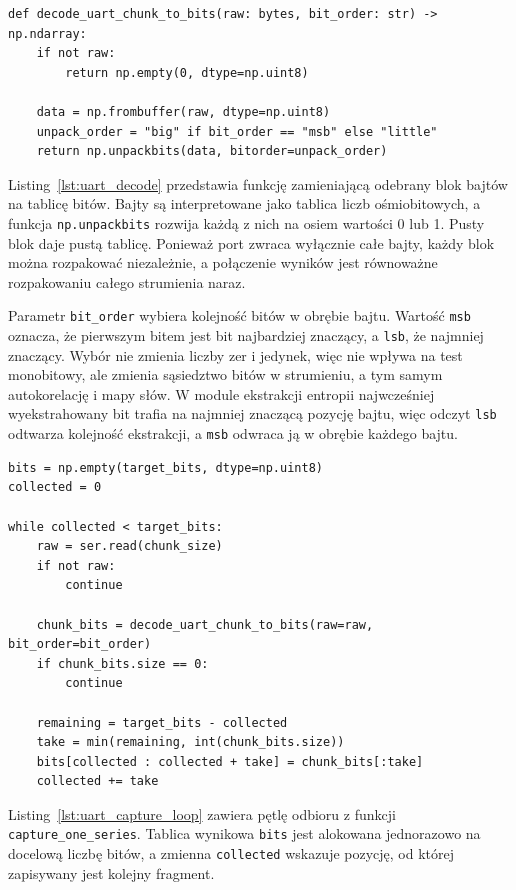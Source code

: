 \begin{lstlisting}[style=pycode,
    caption={Rozpakowanie bajtów do bitów (\texttt{uart\_capture.py})},
    label={lst:uart_decode}]
def decode_uart_chunk_to_bits(raw: bytes, bit_order: str) -> np.ndarray:
    if not raw:
        return np.empty(0, dtype=np.uint8)

    data = np.frombuffer(raw, dtype=np.uint8)
    unpack_order = "big" if bit_order == "msb" else "little"
    return np.unpackbits(data, bitorder=unpack_order)
\end{lstlisting}

Listing~\ref{lst:uart_decode} przedstawia funkcję zamieniającą odebrany blok
bajtów na tablicę bitów. Bajty są interpretowane jako tablica liczb
ośmiobitowych, a funkcja \texttt{np.unpackbits} rozwija każdą z nich na osiem
wartości 0 lub 1. Pusty blok daje pustą tablicę. Ponieważ port zwraca wyłącznie
całe bajty, każdy blok można rozpakować niezależnie, a połączenie wyników jest
równoważne rozpakowaniu całego strumienia naraz.

Parametr \texttt{bit\_order} wybiera kolejność bitów w obrębie bajtu.
Wartość \texttt{msb} oznacza, że pierwszym bitem jest bit najbardziej
znaczący, a \texttt{lsb}, że najmniej znaczący. Wybór nie zmienia liczby zer
i jedynek, więc nie wpływa na test monobitowy, ale zmienia sąsiedztwo bitów
w strumieniu, a tym samym autokorelację i mapy słów. W module ekstrakcji
entropii najwcześniej wyekstrahowany bit trafia na najmniej znaczącą pozycję
bajtu, więc odczyt \texttt{lsb} odtwarza kolejność ekstrakcji, a \texttt{msb}
odwraca ją w obrębie każdego bajtu.

\begin{lstlisting}[style=pycode,
    caption={Odbiór serii o zadanej długości (\texttt{uart\_capture.py})},
    label={lst:uart_capture_loop}]
bits = np.empty(target_bits, dtype=np.uint8)
collected = 0

while collected < target_bits:
    raw = ser.read(chunk_size)
    if not raw:
        continue

    chunk_bits = decode_uart_chunk_to_bits(raw=raw, bit_order=bit_order)
    if chunk_bits.size == 0:
        continue

    remaining = target_bits - collected
    take = min(remaining, int(chunk_bits.size))
    bits[collected : collected + take] = chunk_bits[:take]
    collected += take
\end{lstlisting}

Listing~\ref{lst:uart_capture_loop} zawiera pętlę odbioru z funkcji
\texttt{capture\_one\_series}. Tablica wynikowa \texttt{bits} jest alokowana
jednorazowo na docelową liczbę bitów, a zmienna \texttt{collected} wskazuje
pozycję, od której zapisywany jest kolejny fragment.

